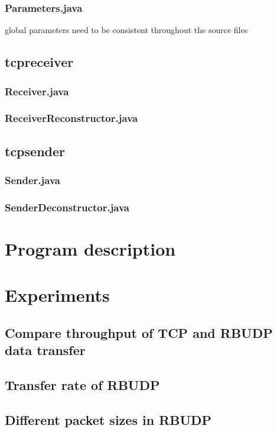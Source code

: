 \documentclass[a4paper,10pt]{article}
\begin{document}
\subsubsection{Parameters.java}
global parameters need to be consistent throughout the source files

\subsection{tcpreceiver}
\subsubsection{Receiver.java}
\subsubsection{ReceiverReconstructor.java}

\subsection{tcpsender}
\subsubsection{Sender.java}
\subsubsection{SenderDeconstructor.java}

\section{Program description}


\section{Experiments}
\subsection{Compare throughput of TCP and RBUDP data transfer}

\subsection{Transfer rate of RBUDP}

\subsection{Different packet sizes in RBUDP}
\end{document}
